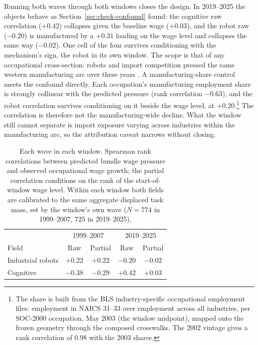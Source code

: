 \documentclass[12pt, a4paper]{article}
\begin{document}
Running both waves through both windows closes the design. In
2019--2025 the objects behave as Section~\ref{sec:check-confound}
found: the cognitive raw correlation ($+0.42$) collapses given the
baseline wage ($+0.03$), and the robot raw ($-0.20$) is manufactured by
a $+0.31$ loading on the wage level and collapses the same way
($-0.02$). One cell of the four survives conditioning with the
mechanism's sign, the robot in its own window. The scope is that of any
occupational cross-section: robots and import competition pressed the
same western manufacturing arc over these years
\parencite{autor2013china}. A manufacturing-share control meets the
confound directly. Each occupation's manufacturing employment share is
strongly collinear with the predicted pressure (rank correlation
$-0.63$), and the robot correlation survives conditioning on it beside
the wage level, at $+0.20$.\footnote{The share is built from the BLS
industry-specific occupational employment files: employment in NAICS
31--33 over employment across all industries, per SOC-2000 occupation,
May 2003 (the window midpoint), mapped onto the frozen geometry through
the composed crosswalks. The 2002 vintage gives a rank correlation of
$0.98$ with the 2003 shares.} The correlation is therefore not the
manufacturing-wide decline. What the window still cannot separate is
import exposure varying across industries within the manufacturing arc,
so the attribution caveat narrows without closing.

\begin{table}[!htbp]
\centering
\caption{Each wave in each window. Spearman rank correlations between
predicted bundle wage pressure and observed occupational wage growth;
the partial correlation conditions on the rank of the start-of-window
wage level. Within each window both fields are calibrated to the same
aggregate displaced task mass, set by the window's own wave ($N=774$ in
1999--2007, $725$ in 2019--2025).}
\label{tab:wave-window}
\begin{tabular}{lcccc}
\toprule
 & \multicolumn{2}{c}{1999--2007} & \multicolumn{2}{c}{2019--2025} \\
Field & Raw & Partial & Raw & Partial \\
\midrule
Industrial robots & $+0.22$ & $+0.22$ & $-0.20$ & $-0.02$ \\
Cognitive & $-0.38$ & $-0.29$ & $+0.42$ & $+0.03$ \\
\bottomrule
\end{tabular}
\end{table}
\end{document}
